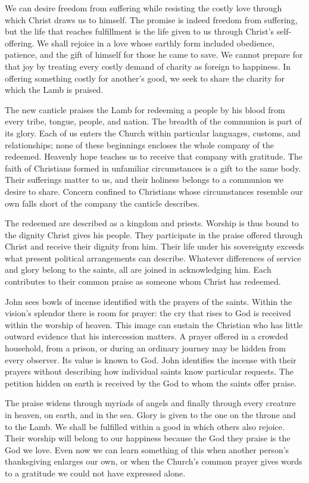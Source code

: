 We can desire freedom from suffering while resisting the costly love through which Christ draws us to himself. The promise is indeed freedom from suffering, but the life that reaches fulfillment is the life given to us through Christ's self-offering. We shall rejoice in a love whose earthly form included obedience, patience, and the gift of himself for those he came to save. We cannot prepare for that joy by treating every costly demand of charity as foreign to happiness. In offering something costly for another's good, we seek to share the charity for which the Lamb is praised.

The new canticle praises the Lamb for redeeming a people by his blood from every tribe, tongue, people, and nation. The breadth of the communion is part of its glory. Each of us enters the Church within particular languages, customs, and relationships; none of these beginnings encloses the whole company of the redeemed. Heavenly hope teaches us to receive that company with gratitude. The faith of Christians formed in unfamiliar circumstances is a gift to the same body. Their sufferings matter to us, and their holiness belongs to a communion we desire to share. Concern confined to Christians whose circumstances resemble our own falls short of the company the canticle describes.

The redeemed are described as a kingdom and priests. Worship is thus bound to the dignity Christ gives his people. They participate in the praise offered through Christ and receive their dignity from him. Their life under his sovereignty exceeds what present political arrangements can describe. Whatever differences of service and glory belong to the saints, all are joined in acknowledging him. Each contributes to their common praise as someone whom Christ has redeemed.

John sees bowls of incense identified with the prayers of the saints. Within the vision's splendor there is room for prayer: the cry that rises to God is received within the worship of heaven. This image can sustain the Christian who has little outward evidence that his intercession matters. A prayer offered in a crowded household, from a prison, or during an ordinary journey may be hidden from every observer. Its value is known to God. John identifies the incense with their prayers without describing how individual saints know particular requests. The petition hidden on earth is received by the God to whom the saints offer praise.

The praise widens through myriads of angels and finally through every creature in heaven, on earth, and in the sea. Glory is given to the one on the throne and to the Lamb. We shall be fulfilled within a good in which others also rejoice. Their worship will belong to our happiness because the God they praise is the God we love. Even now we can learn something of this when another person's thanksgiving enlarges our own, or when the Church's common prayer gives words to a gratitude we could not have expressed alone.

